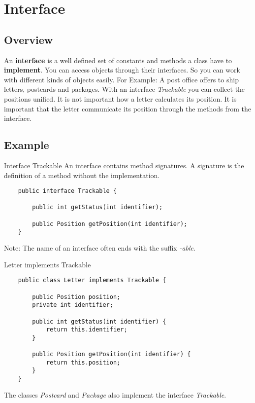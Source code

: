 
\section{Interface}
\subsection{Overview}
\begin{frame}{}
	An \textbf{interface} is a well defined set of constants and methods a class have to \textbf{implement}.
	\vfill
	You can access objects through their interfaces. So you can work with different kinds of objects easily.
	\vfill
	For Example: A post office offers to ship letters, postcards and packages. With an interface
	\emph{Trackable} you can collect the positions unified. 
	It is not important how a letter calculates its position.
	It is important that the letter communicate its position through the methods from the interface.
\end{frame}
\subsection{Example}
\begin{frame}[fragile]{Interface Trackable}
	An interface contains method signatures. A signature is the definition of a method without the implementation.
	\begin{lstlisting}
	public interface Trackable {
	
	    public int getStatus(int identifier);
	    
	    public Position getPosition(int identifier);
	}
	\end{lstlisting}
	Note: The name of an interface often ends with the suffix \emph{-able}.
\end{frame}
\begin{frame}[fragile]{Letter implements Trackable}
	\begin{lstlisting}
	public class Letter implements Trackable {
	
	    public Position position;
	    private int identifier;
	
	    public int getStatus(int identifier) {
	        return this.identifier;
	    }
	    
	    public Position getPosition(int identifier) {
	        return this.position;
	    }
	}
	\end{lstlisting}
	The classes \emph{Postcard} and \emph{Package} also implement the interface \emph{Trackable}.
\end{frame}

